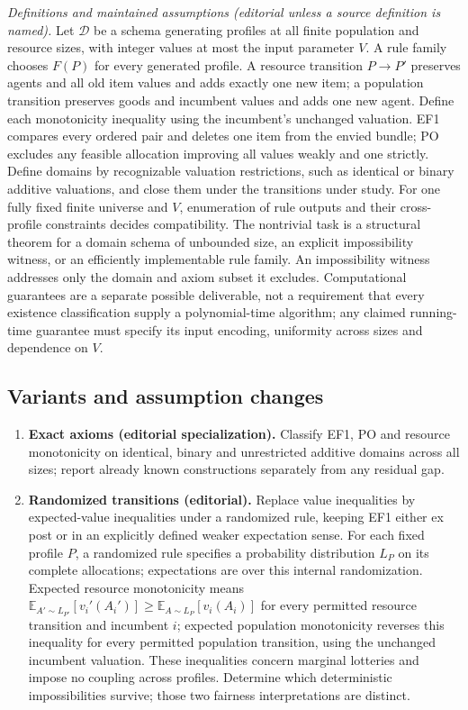 \documentclass[11pt,a4paper]{article}
\newcommand{\E}{\mathbb E}
\begin{document}
\emph{Definitions and maintained assumptions (editorial unless a source definition is named).} Let \(\mathcal D\) be a schema generating profiles at all finite population and resource sizes, with integer values at most the input parameter \(V\). A rule family chooses \(F(P)\) for every generated profile. A resource transition \(P\to P'\) preserves agents and all old item values and adds exactly one new item; a population transition preserves goods and incumbent values and adds one new agent. Define each monotonicity inequality using the incumbent's unchanged valuation. EF1 compares every ordered pair and deletes one item from the envied bundle; PO excludes any feasible allocation improving all values weakly and one strictly. Define domains by recognizable valuation restrictions, such as identical or binary additive valuations, and close them under the transitions under study. For one fully fixed finite universe and \(V\), enumeration of rule outputs and their cross-profile constraints decides compatibility. The nontrivial task is a structural theorem for a domain schema of unbounded size, an explicit impossibility witness, or an efficiently implementable rule family. An impossibility witness addresses only the domain and axiom subset it excludes. Computational guarantees are a separate possible deliverable, not a requirement that every existence classification supply a polynomial-time algorithm; any claimed running-time guarantee must specify its input encoding, uniformity across sizes and dependence on \(V\).
\subsection*{Variants and assumption changes}
\begin{enumerate}
\item \textbf{Exact axioms (editorial specialization).} Classify EF1, PO and resource monotonicity on identical, binary and unrestricted additive domains across all sizes; report already known constructions separately from any residual gap.
\item \textbf{Randomized transitions (editorial).} Replace value inequalities by expected-value inequalities under a randomized rule, keeping EF1 either ex post or in an explicitly defined weaker expectation sense. For each fixed profile \(P\), a randomized rule specifies a probability distribution \(L_P\) on its complete allocations; expectations are over this internal randomization. Expected resource monotonicity means \(\E_{A'\sim L_{P'}}[v_i'(A_i')]\geq\E_{A\sim L_P}[v_i(A_i)]\) for every permitted resource transition and incumbent \(i\); expected population monotonicity reverses this inequality for every permitted population transition, using the unchanged incumbent valuation. These inequalities concern marginal lotteries and impose no coupling across profiles. Determine which deterministic impossibilities survive; those two fairness interpretations are distinct.
\end{enumerate}
\end{document}

